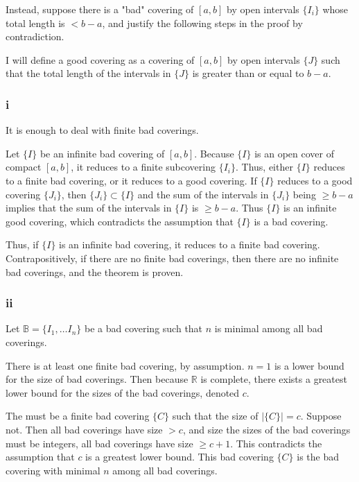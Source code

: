 \documentclass{article}
\newcommand{\R}{\mathbb{R}}
\newcommand{\B}{\mathbb{B}}
\begin{document}
Instead, suppose there is a "bad" covering of $[a, b]$ by open intervals $\{I_i\}$ whose total length is $< b-a$, and justify the following steps in the proof by contradiction.

I will define a good covering as a covering of $[a, b]$ by open intervals $\{J\}$ such that the total length of the intervals in $\{J\}$ is greater than or equal to $b-a$.

\subsubsection*{i}

It is enough to deal with finite bad coverings.

Let $\{I\}$ be an infinite bad covering of $[a, b]$. Because $\{I\}$ is an open cover of compact $[a, b]$, it reduces to a finite subcovering $\{I_i\}$. Thus, either $\{I\}$ reduces to a finite bad covering, or it reduces to a good covering. If $\{I\}$ reduces to a good covering $\{J_i\}$, then  $\{J_i\} \subset \{I\}$ and the sum of the intervals in $\{J_i\}$ being $\geq b-a$ implies that the sum of the intervals in $\{I\}$ is $\geq b-a$. Thus $\{I\}$ is an infinite good covering, which contradicts the assumption that $\{I\}$ is a bad covering.

Thus, if $\{I\}$ is an infinite bad covering, it reduces to a finite bad covering. Contrapositively, if there are no finite bad coverings, then there are no infinite bad coverings, and the theorem is proven.

\subsubsection*{ii}

Let $\B = \{I_1, \dots I_n\}$ be a bad covering such that $n$ is minimal among all bad coverings.

There is at least one finite bad covering, by assumption. $n=1$ is a lower bound for the size of bad coverings. Then because $\R$ is complete, there exists a greatest lower bound for the sizes of the bad coverings, denoted $c$.

The must be a finite bad covering $\{C\}$ such that the size of $|\{C\}| = c$. Suppose not. Then all bad coverings have size $> c$, and size the sizes of the bad coverings must be integers, all bad coverings have size $\geq c+1$. This contradicts the assumption that $c$ is a greatest lower bound. This bad covering $\{C\}$ is the bad covering with minimal $n$ among all bad coverings.
\end{document}
